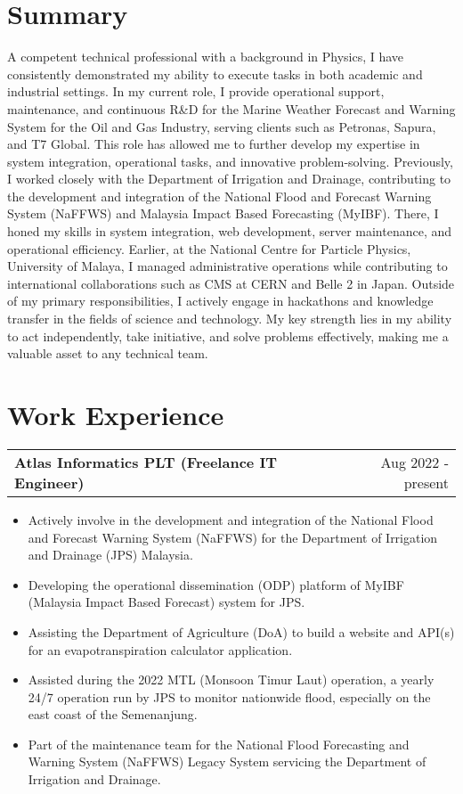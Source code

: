 \documentclass[a4paper,12pt]{article}
\makeatletter
\newenvironment{joblong}[2]
    {
    \begin{tabularx}{\linewidth}{@{}l X r@{}}
    \textbf{#1} & \hfill &  #2 \\[3.75pt]
    \end{tabularx}
    \begin{minipage}[t]{\linewidth}
    \begin{itemize}[nosep,after=\strut, leftmargin=1em, itemsep=3pt,label=--]
    }
    {
    \end{itemize}
    \end{minipage}    
    }
\makeatother
\begin{document}
\section{Summary}
A competent technical professional with a background in Physics, I have consistently demonstrated my ability to execute tasks in both academic and industrial settings. In my current role, I provide operational support, maintenance, and continuous R&D for the Marine Weather Forecast and Warning System for the Oil and Gas Industry, serving clients such as Petronas, Sapura, and T7 Global. This role has allowed me to further develop my expertise in system integration, operational tasks, and innovative problem-solving. Previously, I worked closely with the Department of Irrigation and Drainage, contributing to the development and integration of the National Flood and Forecast Warning System (NaFFWS) and Malaysia Impact Based Forecasting (MyIBF). There, I honed my skills in system integration, web development, server maintenance, and operational efficiency. Earlier, at the National Centre for Particle Physics, University of Malaya, I managed administrative operations while contributing to international collaborations such as CMS at CERN and Belle 2 in Japan. Outside of my primary responsibilities, I actively engage in hackathons and knowledge transfer in the fields of science and technology. My key strength lies in my ability to act independently, take initiative, and solve problems effectively, making me a valuable asset to any technical team.


\section{Work Experience}

\begin{joblong}{Atlas Informatics PLT (Freelance IT Engineer)}{Aug 2022 - present}
\item Actively involve in the development and integration of the National Flood and Forecast Warning System (NaFFWS) for the Department of Irrigation and Drainage (JPS) Malaysia.
\item Developing the operational dissemination (ODP) platform of MyIBF (Malaysia Impact Based Forecast) system for JPS.
\item Assisting the Department of Agriculture (DoA) to build a website and API(s) for an evapotranspiration calculator application.
\item Assisted during the 2022 MTL (Monsoon Timur Laut) operation, a yearly 24/7 operation run by JPS to monitor nationwide flood, especially on the east coast of the Semenanjung.
\item Part of the maintenance team for the National Flood Forecasting and Warning System (NaFFWS) Legacy System servicing the Department of Irrigation and Drainage.
\end{joblong}
\end{document}
